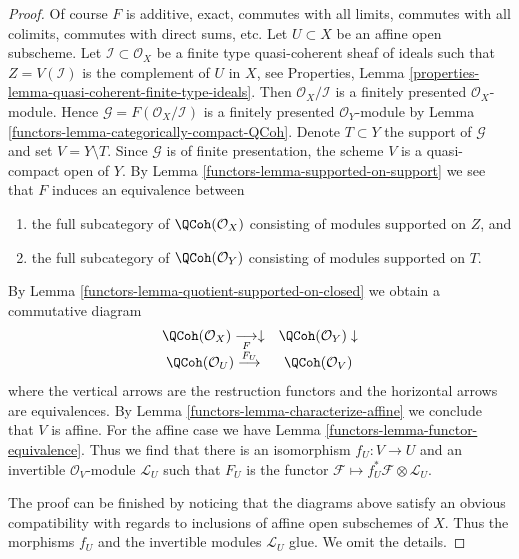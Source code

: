 \begin{proof}

Of course $F$ is additive, exact, commutes with all limits,
commutes with all colimits, commutes with direct sums, etc.
Let $U \subset X$ be an affine open subscheme.
Let $\mathcal{I} \subset \mathcal{O}_X$ be a finite type
quasi-coherent sheaf of ideals such that $Z = V(\mathcal{I})$
is the complement of $U$ in $X$, see
Properties, Lemma \ref{properties-lemma-quasi-coherent-finite-type-ideals}.
Then $\mathcal{O}_X/\mathcal{I}$ is a finitely presented
$\mathcal{O}_X$-module. Hence $\mathcal{G} = F(\mathcal{O}_X/\mathcal{I})$
is a finitely presented $\mathcal{O}_Y$-module by
Lemma \ref{functors-lemma-categorically-compact-QCoh}.
Denote $T \subset Y$ the support of $\mathcal{G}$ and set
$V = Y \setminus T$. Since $\mathcal{G}$ is of finite presentation,
the scheme $V$ is a quasi-compact open of $Y$.
By Lemma \ref{functors-lemma-supported-on-support} we see that $F$ induces an
equivalence between
\begin{enumerate}
\item the full subcategory of $\QCoh(\mathcal{O}_X)$ consisting
of modules supported on $Z$, and
\item the full subcategory of $\QCoh(\mathcal{O}_Y)$ consisting
of modules supported on $T$.
\end{enumerate}
By Lemma \ref{functors-lemma-quotient-supported-on-closed} we obtain a commutative
diagram
$$
\begin{array}{cc}\QCoh(\mathcal{O}_X) \underset{F}{\longrightarrow}\downarrow & \QCoh(\mathcal{O}_Y) \downarrow \\ \QCoh(\mathcal{O}_U) \overset{F_U}{\longrightarrow} & \QCoh(\mathcal{O}_V)\end{array}
$$
where the vertical arrows are the restruction functors and the
horizontal arrows are equivalences. By Lemma \ref{functors-lemma-characterize-affine}
we conclude that $V$ is affine. For the affine case we have
Lemma \ref{functors-lemma-functor-equivalence}. Thus we find that there
is an isomorphism $f_U : V \to U$ and an invertible
$\mathcal{O}_V$-module $\mathcal{L}_U$ such that
$F_U$ is the functor
$\mathcal{F} \mapsto f_U^*\mathcal{F} \otimes \mathcal{L}_U$.

\medskip\noindent
The proof can be finished by noticing that the diagrams above
satisfy an obvious compatibility with regards to inclusions
of affine open subschemes of $X$. Thus the morphisms $f_U$ and the
invertible modules $\mathcal{L}_U$ glue. We omit the details.
\end{proof}

